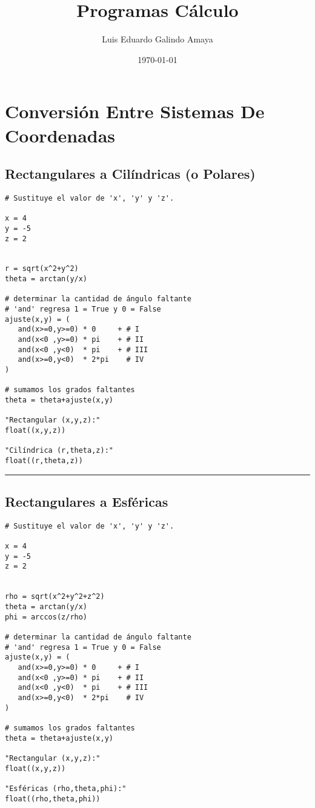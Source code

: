 \documentclass{article}
\author{Luis Eduardo Galindo Amaya}
\date{\today}
\title{Programas Cálculo}
\begin{document}
\maketitle
\tableofcontents

\newpage 

\section{Conversión Entre Sistemas De Coordenadas}
\label{sec:org919699c}
\subsection{Rectangulares a Cilíndricas (o Polares)}
\label{sec:org551f49d}
\begin{verbatim}
# Sustituye el valor de 'x', 'y' y 'z'.

x = 4
y = -5
z = 2


r = sqrt(x^2+y^2)
theta = arctan(y/x)

# determinar la cantidad de ángulo faltante
# 'and' regresa 1 = True y 0 = False
ajuste(x,y) = ( 
   and(x>=0,y>=0) * 0     + # I
   and(x<0 ,y>=0) * pi    + # II
   and(x<0 ,y<0)  * pi    + # III
   and(x>=0,y<0)  * 2*pi    # IV
)

# sumamos los grados faltantes
theta = theta+ajuste(x,y)

"Rectangular (x,y,z):"
float((x,y,z))

"Cilíndrica (r,theta,z):"
float((r,theta,z))
\end{verbatim}

\noindent\rule{\textwidth}{0.5pt}

\newpage 

\subsection{Rectangulares a Esféricas}
\label{sec:org7e8517c}
\begin{verbatim}
# Sustituye el valor de 'x', 'y' y 'z'.

x = 4
y = -5
z = 2


rho = sqrt(x^2+y^2+z^2)
theta = arctan(y/x)
phi = arccos(z/rho)

# determinar la cantidad de ángulo faltante
# 'and' regresa 1 = True y 0 = False
ajuste(x,y) = ( 
   and(x>=0,y>=0) * 0     + # I
   and(x<0 ,y>=0) * pi    + # II
   and(x<0 ,y<0)  * pi    + # III
   and(x>=0,y<0)  * 2*pi    # IV
)

# sumamos los grados faltantes
theta = theta+ajuste(x,y)

"Rectangular (x,y,z):"
float((x,y,z))

"Esféricas (rho,theta,phi):"
float((rho,theta,phi))
\end{verbatim}
\end{document}

